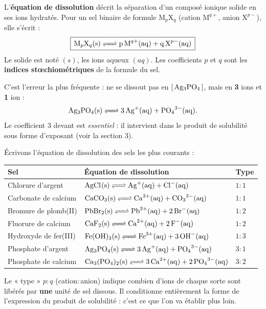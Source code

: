 \documentclass[11pt,a4paper]{article}
\newcommand{\Ce}[1]{\left[\,\ce{#1}\,\right]}   %
\begin{document}
\begin{definition}
L'\textbf{équation de dissolution} décrit la séparation d'un composé ionique solide en ses ions
hydratés. Pour un sel binaire de formule $\mathrm{M}_p\mathrm{X}_q$ (cation $\mathrm{M}^{q+}$,
anion $\mathrm{X}^{p-}$), elle s'écrit :
\[ \boxed{\,\ce{M_{p}X_{q}(s) <=> p\,M^{q+}(aq) + q\,X^{p-}(aq)}\,} \]
Le solide est noté $(s)$, les ions aqueux $(aq)$. Les coefficients $p$ et $q$ sont les
\textbf{indices stœchiométriques} de la formule du sel.
\end{definition}

\begin{attention}
C'est l'erreur la plus fréquente :  ne se dissout pas en $\Ce{Ag3PO4}$, mais en
\textbf{3} ions  et \textbf{1} ion  :
\[ \ce{Ag3PO4(s) <=> 3 Ag^{+}(aq) + PO4^{3-}(aq)}. \]
Le coefficient $3$ devant  est \emph{essentiel} : il intervient dans le produit de solubilité
sous forme d'exposant (voir la section 3).
\end{attention}

\begin{exemple}
Écrivons l'équation de dissolution des sels les plus courants :

\smallskip
\begin{center}\renewcommand{\arraystretch}{1.35}
\begin{tabular}{l l l}
\toprule
\rowcolor{primary!12}
\textbf{Sel} & \textbf{Équation de dissolution} & \textbf{Type}\\
\midrule
Chlorure d'argent & $\ce{AgCl(s) <=> Ag^{+}(aq) + Cl^{-}(aq)}$ & $1{:}1$\\
Carbonate de calcium & $\ce{CaCO3(s) <=> Ca^{2+}(aq) + CO3^{2-}(aq)}$ & $1{:}1$\\
Bromure de plomb(II) & $\ce{PbBr2(s) <=> Pb^{2+}(aq) + 2 Br^{-}(aq)}$ & $1{:}2$\\
Fluorure de calcium & $\ce{CaF2(s) <=> Ca^{2+}(aq) + 2 F^{-}(aq)}$ & $1{:}2$\\
Hydroxyde de fer(III) & $\ce{Fe(OH)3(s) <=> Fe^{3+}(aq) + 3 OH^{-}(aq)}$ & $1{:}3$\\
Phosphate d'argent & $\ce{Ag3PO4(s) <=> 3 Ag^{+}(aq) + PO4^{3-}(aq)}$ & $3{:}1$\\
Phosphate de calcium & $\ce{Ca3(PO4)2(s) <=> 3 Ca^{2+}(aq) + 2 PO4^{3-}(aq)}$ & $3{:}2$\\
\bottomrule
\end{tabular}
\end{center}

\smallskip
Le « type » $p{:}q$ (cation$:$anion) indique combien d'ions de chaque sorte sont libérés par
\textbf{une} unité de sel dissous. Il conditionne entièrement la forme de l'expression du produit de
solubilité : c'est ce que l'on va établir plus loin.
\end{exemple}
\end{document}

